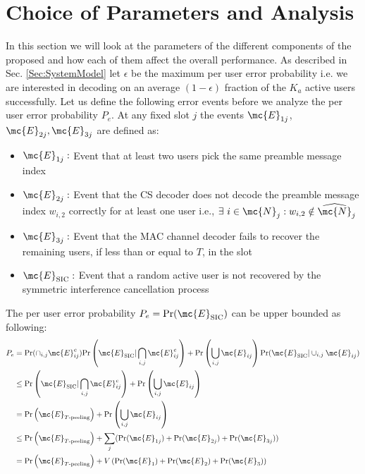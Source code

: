 \documentclass[final,onecolumn,12pt]{IEEEtran}
\def\Pr{\mathrm{Pr}}
\begin{document}
\section{Choice of Parameters and Analysis}
In this section we will look at the parameters of the different components of the proposed and how each of them affect the overall performance. As described in Sec. \ref{Sec:SystemModel} let $\epsilon$ be the maximum per user error probability i.e. we are interested in decoding on an average $(1-\epsilon)$ fraction of the $K_a$ active users successfully. Let us define the following error events before we analyze the per user error probability $P_e$. At any fixed slot $j$ the events $\mc{E}_{1j}$, $\mc{E}_{2j}, \mc{E}_{3j}$ are defined as:
\begin{itemize}
\item $ \mc{E}_{1j}:$ Event that at least two users pick the same preamble message index%
\item $ \mc{E}_{2j}:$ Event that the CS decoder does not decode the preamble message index $w_{i,2}$  correctly for at least one user i.e., $\exists~ i \in\mc{N}_j : w_{i,2} \notin \widehat{\mc{N}}_j $
\item $ \mc{E}_{3j}:$  Event that the MAC channel decoder fails to recover the remaining users, if less than or equal to $T$, in the slot
\item $\mc{E}_{\text{SIC}}:$ Event that a random active user is not recovered by the symmetric interference cancellation process
\end{itemize}
The per user error probability $P_e=\Pr(\mc{E}_{\text{SIC}})$ can be upper bounded as following:
\begin{align}
P_e &= \Pr(\cap_{i,j}\mc{E}^c_{ij})\Pr\left(\mc{E}_{\text{SIC}}|\bigcap_{i,j}\mc{E}^c_{ij}\right)+ \Pr\left(\bigcup_{i,j}\mc{E}_{ij}\right)\Pr(\mc{E}_{\text{SIC}}|\cup_{i,j}\mc{E}_{ij})\notag\\
&\leq \Pr\left(\mc{E}_{\text{SIC}}|\bigcap_{i,j}\mc{E}^c_{ij}\right)+ \Pr\left(\bigcup_{i,j}\mc{E}_{ij}\right)\notag\\
&=\Pr\left(\mc{E}_{T\text{-peeling}}\right)+\Pr\left(\bigcup_{i,j}\mc{E}_{ij}\right)\notag\\
&\leq\Pr\left(\mc{E}_{T\text{-peeling}}\right)+\sum_{j} (\Pr (\mc{E}_{1j})  + \Pr (\mc{E}_{2j})+ \Pr (\mc{E}_{3j}))\notag\\
&=\Pr\left(\mc{E}_{T\text{-peeling}}\right)+V\left(\Pr(\mc{E}_1)+\Pr(\mc{E}_2)+\Pr(\mc{E}_3) \right) \label{eqn:errPrb_split}
\end{align}
\end{document}
